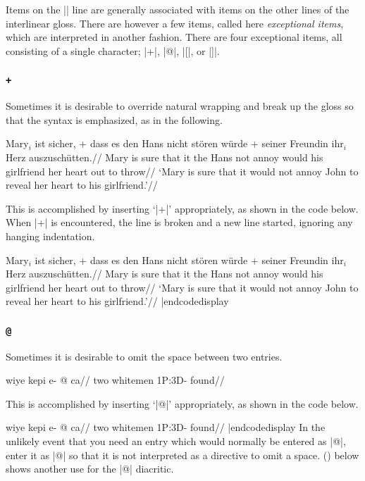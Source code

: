 Items on the |\gla| line are generally associated with items on the
other lines of the interlinear gloss.  There are however a few items,
called here {\it exceptional items}, which are interpreted in another
fashion. There are four exceptional items, all consisting of a single character;
|+|, |@|, |[|, or |]|.

\subsubsection {\tt +}

Sometimes it is desirable to override natural wrapping and
break up the gloss so that the syntax is emphasized, as in the
following.

\framedisplay
\ex
\begingl
\gla Mary$_i$ ist sicher, + dass es den Hans nicht st\"oren w\"urde
+ seiner Freundin ihr$_i$ Herz auszusch\"utten.//
\glb Mary is sure that it the Hans not annoy would
his girlfriend her heart {out to
throw}//
\glft  `Mary is sure that it would not annoy John to reveal her
heart to his girlfriend.'//
\endgl
\xe
\endframedisplay

\bigskip
This is accomplished by inserting `|+|' appropriately, as shown in the
code below.  When |+| is encountered, the line is broken and a new
line started, ignoring any hanging indentation.

\codedisplay
\ex
\begingl
\gla Mary$_i$ ist sicher, + dass es den Hans nicht st\"oren w\"urde
+ seiner Freundin ihr$_i$ Herz auszusch\"utten.//
\glb Mary is sure that it the Hans not annoy would
his girlfriend her heart {out to
throw}//
\glft  `Mary is sure that it would not annoy John to reveal her
heart to his girlfriend.'//
\endgl
\xe
|endcodedisplay

\subsubsection {\tt @}

Sometimes it is desirable to omit the space between two entries.

\framedisplay
\ex
\begingl
\gla wiye kepi e- @ ca//
\glb two whitemen \sc1P:3D- found//
\endgl
\xe
\endframedisplay

This is accomplished by inserting `|@|' appropriately, as shown
in the code below.

\codedisplay
\ex
\begingl
\gla wiye kepi e- @ ca//
\glb two whitemen \sc1P:3D- found//
\endgl
\xe
|endcodedisplay
In the unlikely event that you need an entry which
would normally be entered as |@|, enter it as |{{@}}|
so that it is not interpreted as a directive to omit a space.
() below shows another use for the |@| diacritic.

